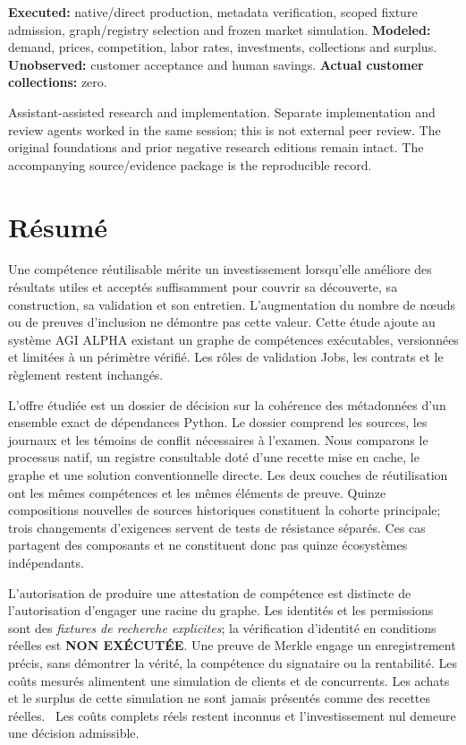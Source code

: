 \documentclass[11pt,a4paper]{article}
\newcommand{\scopebox}[2]{\begin{tcolorbox}[colback=AlphaLilac,colframe=AlphaPurple,boxrule=.5pt,arc=1mm,left=2.5mm,right=2.5mm,top=1.8mm,bottom=1.8mm,title={#1},fonttitle=\sffamily\bfseries]#2\end{tcolorbox}}
\begin{document}
\scopebox{Evidence boundary}{\small
\textbf{Executed:} native/direct production, metadata verification, scoped fixture admission, graph/registry selection and frozen market simulation.\quad
\textbf{Modeled:} demand, prices, competition, labor rates, investments, collections and surplus.\quad
\textbf{Unobserved:} customer acceptance and human savings.\quad
\textbf{Actual customer collections:} zero.}

\vfill
{\footnotesize\color{AlphaGray}Assistant-assisted research and implementation. Separate implementation and review agents worked in the same session; this is not external peer review. The original foundations and prior negative research editions remain intact. The accompanying source/evidence package is the reproducible record.}
\newpage

\section*{Résumé}
Une compétence réutilisable mérite un investissement lorsqu'elle améliore des résultats utiles et acceptés suffisamment pour couvrir sa découverte, sa construction, sa validation et son entretien. L'augmentation du nombre de nœuds ou de preuves d'inclusion ne démontre pas cette valeur. Cette étude ajoute au système AGI ALPHA existant un graphe de compétences exécutables, versionnées et limitées à un périmètre vérifié. Les rôles de validation Jobs, les contrats et le règlement restent inchangés.

L'offre étudiée est un dossier de décision sur la cohérence des métadonnées d'un ensemble exact de dépendances Python. Le dossier comprend les sources, les journaux et les témoins de conflit nécessaires à l'examen. Nous comparons le processus natif, un registre consultable doté d'une recette mise en cache, le graphe et une solution conventionnelle directe. Les deux couches de réutilisation ont les mêmes compétences et les mêmes éléments de preuve. Quinze compositions nouvelles de sources historiques constituent la cohorte principale; trois changements d'exigences servent de tests de résistance séparés. Ces cas partagent des composants et ne constituent donc pas quinze écosystèmes indépendants.

L'autorisation de produire une attestation de compétence est distincte de l'autorisation d'engager une racine du graphe. Les identités et les permissions sont des \emph{fixtures de recherche explicites}; la vérification d'identité en conditions réelles est \textbf{NON EXÉCUTÉE}. Une preuve de Merkle engage un enregistrement précis, sans démontrer la vérité, la compétence du signataire ou la rentabilité. Les coûts mesurés alimentent une simulation de clients et de concurrents. Les achats et le surplus de cette simulation ne sont jamais présentés comme des recettes réelles. \FrenchResult\ Les coûts complets réels restent inconnus et l'investissement nul demeure une décision admissible.
\end{document}
